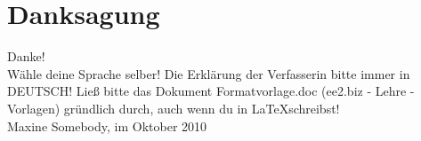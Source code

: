 
\thispagestyle{empty}
\chapter*{Danksagung}

Danke!\\
Wähle deine Sprache selber! Die Erklärung der Verfasserin bitte immer in DEUTSCH!
Ließ bitte das Dokument Formatvorlage.doc (ee2.biz - Lehre - Vorlagen) gründlich durch, auch wenn du in \LaTeX  schreibst!
\\[1cm]
%
Maxine Somebody, im Oktober 2010